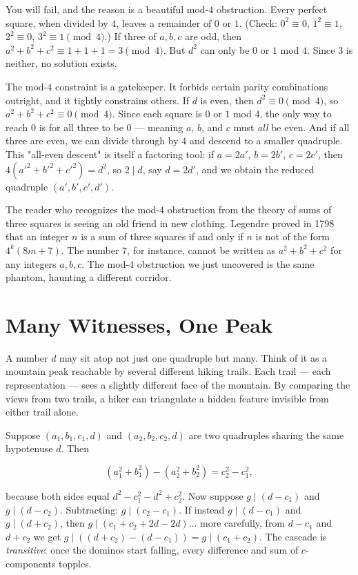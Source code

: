 \documentclass[11pt,twoside,openright]{book}
\theoremstyle{definition}
\theoremstyle{remark}
\begin{document}
You will fail, and the reason is a beautiful mod-$4$ obstruction. Every perfect square, when divided by $4$, leaves a remainder of $0$ or $1$. (Check: $0^2 \equiv 0$, $1^2 \equiv 1$, $2^2 \equiv 0$, $3^2 \equiv 1 \pmod{4}$.) If three of $a, b, c$ are odd, then $a^2 + b^2 + c^2 \equiv 1 + 1 + 1 = 3 \pmod{4}$. But $d^2$ can only be $0$ or $1$ mod $4$. Since $3$ is neither, no solution exists.

The mod-$4$ constraint is a gatekeeper. It forbids certain parity combinations outright, and it tightly constrains others. If $d$ is even, then $d^2 \equiv 0 \pmod{4}$, so $a^2 + b^2 + c^2 \equiv 0 \pmod{4}$. Since each square is $0$ or $1$ mod $4$, the only way to reach $0$ is for all three to be $0$ --- meaning $a$, $b$, and $c$ must \textit{all} be even. And if all three are even, we can divide through by $4$ and descend to a smaller quadruple. This "all-even descent" is itself a factoring tool: if $a = 2a'$, $b = 2b'$, $c = 2c'$, then $4(a'^2 + b'^2 + c'^2) = d^2$, so $2 \mid d$, say $d = 2d'$, and we obtain the reduced quadruple $(a', b', c', d')$.

The reader who recognizes the mod-$4$ obstruction from the theory of sums of three squares is seeing an old friend in new clothing. Legendre proved in 1798 that an integer $n$ is a sum of three squares if and only if $n$ is not of the form $4^k(8m + 7)$. The number $7$, for instance, cannot be written as $a^2 + b^2 + c^2$ for any integers $a, b, c$. The mod-$4$ obstruction we just uncovered is the same phantom, haunting a different corridor.



\section{Many Witnesses, One Peak}

A number $d$ may sit atop not just one quadruple but many. Think of it as a mountain peak reachable by several different hiking trails. Each trail --- each representation --- sees a slightly different face of the mountain. By comparing the views from two trails, a hiker can triangulate a hidden feature invisible from either trail alone.

Suppose $(a_1, b_1, c_1, d)$ and $(a_2, b_2, c_2, d)$ are two quadruples sharing the same hypotenuse $d$. Then

\[(a_1^2 + b_1^2) - (a_2^2 + b_2^2) = c_2^2 - c_1^2,\]

because both sides equal $d^2 - c_1^2 - d^2 + c_2^2$. Now suppose $g \mid (d - c_1)$ and $g \mid (d - c_2)$. Subtracting: $g \mid (c_2 - c_1)$. If instead $g \mid (d - c_1)$ and $g \mid (d + c_2)$, then $g \mid (c_1 + c_2 + 2d - 2d)$... more carefully, from $d - c_1$ and $d + c_2$ we get $g \mid ((d + c_2) - (d - c_1)) = g \mid (c_1 + c_2)$. The cascade is \textit{transitive}: once the dominos start falling, every difference and sum of $c$-components topples.
\end{document}
